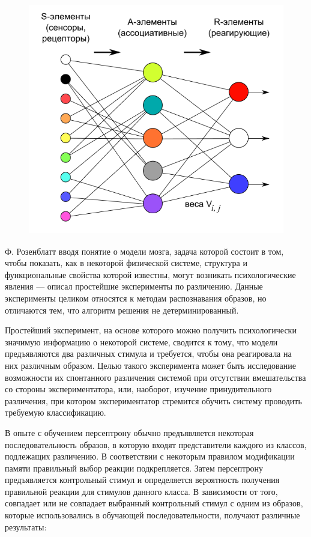 \begin{figure}[t]
	\centering
	\includegraphics[height=4in]{images/intro_perceptron}
\end{figure}
Ф. Розенблатт вводя понятие о модели мозга, задача которой состоит в том, чтобы показать, как в некоторой физической системе, структура и функциональные свойства которой известны, могут возникать психологические явления — описал простейшие эксперименты по различению. Данные эксперименты целиком относятся к методам распознавания образов, но отличаются тем, что алгоритм решения не детерминированный.

Простейший эксперимент, на основе которого можно получить психологически значимую информацию о некоторой системе, сводится к тому, что модели предъявляются два различных стимула и требуется, чтобы она реагировала на них различным образом. Целью такого эксперимента может быть исследование возможности их спонтанного различения системой при отсутствии вмешательства со стороны экспериментатора, или, наоборот, изучение принудительного различения, при котором экспериментатор стремится обучить систему проводить требуемую классификацию.

В опыте с обучением персептрону обычно предъявляется некоторая последовательность образов, в которую входят представители каждого из классов, подлежащих различению. В соответствии с некоторым правилом модификации памяти правильный выбор реакции подкрепляется. Затем персептрону предъявляется контрольный стимул и определяется вероятность получения правильной реакции для стимулов данного класса. В зависимости от того, совпадает или не совпадает выбранный контрольный стимул с одним из образов, которые использовались в обучающей последовательности, получают различные результаты:

